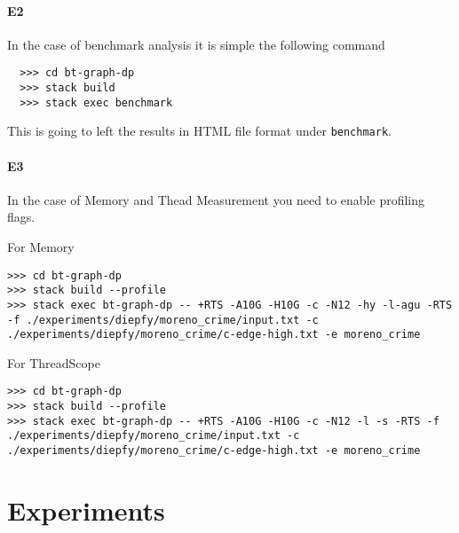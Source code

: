 \paragraph{E2} In the case of benchmark analysis it is simple the following command
\begin{verbatim}
  >>> cd bt-graph-dp
  >>> stack build
  >>> stack exec benchmark
  \end{verbatim}

\setlength{\rightskip}{0pt plus 1 fil}
This is going to left the results in HTML file format under \texttt{benchmark}.


\paragraph{E3} In the case of Memory and Thead Measurement you need to enable profiling flags.

For Memory
\begin{verbatim}
>>> cd bt-graph-dp
>>> stack build --profile
>>> stack exec bt-graph-dp -- +RTS -A10G -H10G -c -N12 -hy -l-agu -RTS -f ./experiments/diepfy/moreno_crime/input.txt -c ./experiments/diepfy/moreno_crime/c-edge-high.txt -e moreno_crime
\end{verbatim}

For ThreadScope
\begin{verbatim}
>>> cd bt-graph-dp
>>> stack build --profile
>>> stack exec bt-graph-dp -- +RTS -A10G -H10G -c -N12 -l -s -RTS -f ./experiments/diepfy/moreno_crime/input.txt -c ./experiments/diepfy/moreno_crime/c-edge-high.txt -e moreno_crime
\end{verbatim}

\section{Experiments}
